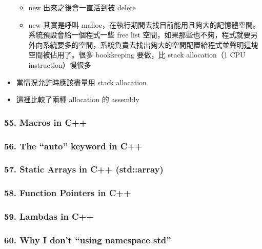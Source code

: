 \documentclass[11pt]{article}
\providecommand{\tightlist}{%
      \setlength{\itemsep}{0pt}\setlength{\parskip}{0pt}}
\begin{document}
\begin{itemize}
  \begin{itemize}
  \tightlist
  \item
    new 出來之後會一直活到被 delete
  \item
    new 其實是呼叫
    malloc，在執行期間去找目前能用且夠大的記憶體空間。系統預設會給一個程式一些
    free list
    空間，如果那些也不夠，程式就要另外向系統要多的空間，系統負責去找出夠大的空間配置給程式並聲明這塊空間被佔用了。很多
    bookkeeping 要做，比 stack allocation（1 CPU instruction）慢很多
  \end{itemize}
\item
  當情況允許時應該盡量用 stack allocation
\item
  \href{https://youtu.be/wJ1L2nSIV1s?list=PLlrATfBNZ98dudnM48yfGUldqGD0S4FFb\&t=828}{這裡}比較了兩種
  allocation 的 assembly
\end{itemize}

\hypertarget{macros-in-c}{%
\subsubsection{55. Macros in C++}\label{macros-in-c}}

\hypertarget{the-auto-keyword-in-c}{%
\subsubsection{56. The ``auto'' keyword in
C++}\label{the-auto-keyword-in-c}}

\hypertarget{static-arrays-in-c-stdarray}{%
\subsubsection{57. Static Arrays in C++
(std::array)}\label{static-arrays-in-c-stdarray}}

\hypertarget{function-pointers-in-c}{%
\subsubsection{58. Function Pointers in
C++}\label{function-pointers-in-c}}

\hypertarget{lambdas-in-c}{%
\subsubsection{59. Lambdas in C++}\label{lambdas-in-c}}

\hypertarget{why-i-dont-using-namespace-std}{%
\subsubsection{60. Why I don't ``using namespace
std''}\label{why-i-dont-using-namespace-std}}
\end{document}
